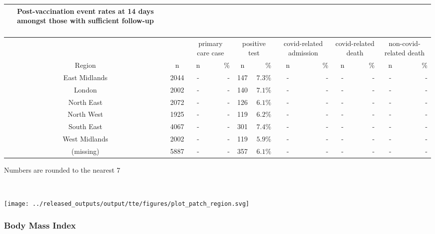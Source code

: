 \documentclass[
]{article}
\begin{document}
\captionsetup[table]{labelformat=empty,skip=1pt}
\begin{longtable}{cccrcrcrcrcr}
\caption*{
\large Post-vaccination event rates at 14 days amongst those with sufficient follow-up\\ 
\small \\ 
} \\ 
\toprule
& & \multicolumn{2}{c}{primary care case} & \multicolumn{2}{c}{positive test} & \multicolumn{2}{c}{covid-related admission} & \multicolumn{2}{c}{covid-related death} & \multicolumn{2}{c}{non-covid-related death} \\ 
 \cmidrule(lr){3-4}\cmidrule(lr){5-6}\cmidrule(lr){7-8}\cmidrule(lr){9-10}\cmidrule(lr){11-12}
Region & n & n & \% & n & \% & n & \% & n & \% & n & \% \\ 
\midrule
East Midlands & 2044 & - & - & 147 & $7.3\%$ & - & - & - & - & - & - \\ 
London & 2002 & - & - & 140 & $7.1\%$ & - & - & - & - & - & - \\ 
North East & 2072 & - & - & 126 & $6.1\%$ & - & - & - & - & - & - \\ 
North West & 1925 & - & - & 119 & $6.2\%$ & - & - & - & - & - & - \\ 
South East & 4067 & - & - & 301 & $7.4\%$ & - & - & - & - & - & - \\ 
West Midlands & 2002 & - & - & 119 & $5.9\%$ & - & - & - & - & - & - \\ 
(missing) & 5887 & - & - & 357 & $6.1\%$ & - & - & - & - & - & - \\ 
\bottomrule
\end{longtable}
\begin{minipage}{\linewidth}
Numbers are rounded to the nearest 7\\ 
\end{minipage}

~ ~

\texttt{[image: ../released\_outputs/output/tte/figures/plot\_patch\_region.svg]}

\hypertarget{body-mass-index}{%
\subsubsection{Body Mass Index}\label{body-mass-index}}
\end{document}
